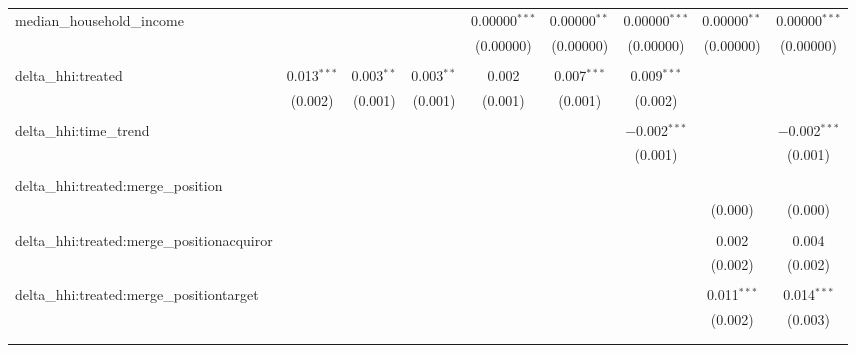\begin{table}[H]
{\begin{tabular}{@{\extracolsep{5pt}}lcccccccc}
  median\_household\_income &  &  &  & 0.00000$^{***}$ & 0.00000$^{**}$ & 0.00000$^{***}$ & 0.00000$^{**}$ & 0.00000$^{***}$ \\  

   &  &  &  & (0.00000) & (0.00000) & (0.00000) & (0.00000) & (0.00000) \\  

   & & & & & & & & \\  

  delta\_hhi:treated & 0.013$^{***}$ & 0.003$^{**}$ & 0.003$^{**}$ & 0.002 & 0.007$^{***}$ & 0.009$^{***}$ &  &  \\  

   & (0.002) & (0.001) & (0.001) & (0.001) & (0.001) & (0.002) &  &  \\  

   & & & & & & & & \\  

  delta\_hhi:time\_trend &  &  &  &  &  & $-$0.002$^{***}$ &  & $-$0.002$^{***}$ \\  

   &  &  &  &  &  & (0.001) &  & (0.001) \\  

   & & & & & & & & \\  

  delta\_hhi:treated:merge\_position &  &  &  &  &  &  &  &  \\  

   &  &  &  &  &  &  & (0.000) & (0.000) \\  

   & & & & & & & & \\  

  delta\_hhi:treated:merge\_positionacquiror &  &  &  &  &  &  & 0.002 & 0.004 \\  

   &  &  &  &  &  &  & (0.002) & (0.002) \\  

   & & & & & & & & \\  

  delta\_hhi:treated:merge\_positiontarget &  &  &  &  &  &  & 0.011$^{***}$ & 0.014$^{***}$ \\  

   &  &  &  &  &  &  & (0.002) & (0.003) \\  

   & & & & & & & & \\  

 \hline \\[-1.8ex]  


\end{tabular}}
\end{table}
